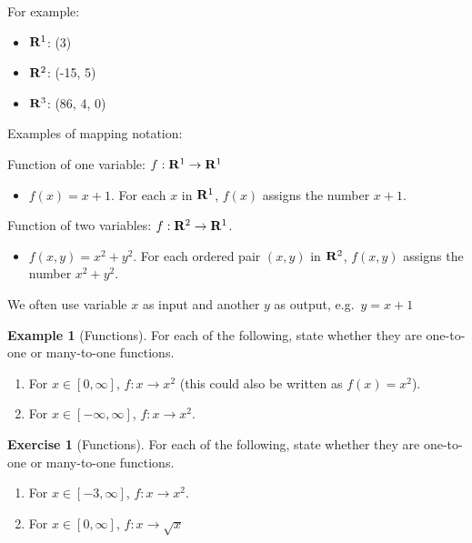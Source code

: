 \documentclass[
]{book}
\providecommand{\tightlist}{%
  \setlength{\itemsep}{0pt}\setlength{\parskip}{0pt}}
\theoremstyle{definition}
\theoremstyle{definition}
\newtheorem{example}{Example}[chapter]
\theoremstyle{definition}
\newtheorem{exercise}{Exercise}[chapter]
\theoremstyle{definition}
\theoremstyle{remark}
\begin{document}
For example:

\begin{itemize}
\tightlist
\item
  \({\bf R}^1\): (3)
\item
  \({\bf R}^2\): (-15, 5)
\item
  \({\bf R}^3\): (86, 4, 0)
\end{itemize}

Examples of mapping notation:

Function of one variable: \(f:{\bf R}^1\to{\bf R}^1\)

\begin{itemize}
\tightlist
\item
  \(f(x)=x+1\). For each \(x\) in \({\bf R}^1\), \(f(x)\) assigns the number \(x+1\).
\end{itemize}

Function of two variables: \(f: {\bf R}^2\to{\bf R}^1\).

\begin{itemize}
\tightlist
\item
  \(f(x,y)=x^2+y^2\). For each ordered pair \((x,y)\) in \({\bf R}^2\), \(f(x,y)\) assigns the number \(x^2+y^2\).
\end{itemize}

We often use variable \(x\) as input and another \(y\) as output, e.g.~\(y=x+1\)

\begin{example}[Functions]
\protect\hypertarget{exm:functions}{}{\label{exm:functions} {} }
For each of the following, state whether they are one-to-one or many-to-one functions.

\begin{enumerate}
\def\labelenumi{\arabic{enumi}.}
\item
  For \(x \in [0,\infty]\), \(f : x \rightarrow x^2\) (this could also be written as \(f(x) = x^2\)).
\item
  For \(x \in [-\infty, \infty]\), \(f: x \rightarrow x^2\).
\end{enumerate}
\end{example}

\begin{exercise}[Functions]
\protect\hypertarget{exr:functions1}{}{\label{exr:functions1} {} }
For each of the following, state whether they are one-to-one or many-to-one functions.

\begin{enumerate}
\def\labelenumi{\arabic{enumi}.}
\item
  For \(x \in [-3, \infty]\), \(f: x \rightarrow x^2\).
\item
  For \(x \in [0, \infty]\), \(f: x \rightarrow \sqrt{x}\)
\end{enumerate}
\end{exercise}
\end{document}
